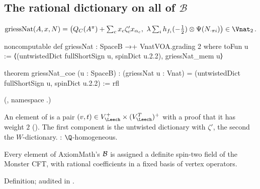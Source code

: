 \subsection{The rational dictionary on all of \texorpdfstring{$\mathcal B$}{B}}

\begin{definition}\label{ch21:def:griessNat}
$\mathrm{griessNat}(A,x,N)=\bigl(Q_C(A^\pi)+\sum_cx_c\zeta'_cx_{\alpha_c},\ \lambda\sum_ih_{f_i}(-\tfrac12)\otimes\Psi(N_{\cdot\pi i})\bigr)\in\Vnat_2$.
\end{definition}
\begin{leancode}
noncomputable def griessNat : SpaceB →+ VnatVOA.grading 2 where
  toFun u := ⟨(untwistedDict fullShortSign u, spinDict u.2.2), griessNat_mem u⟩
\end{leancode}
\begin{leancode}
theorem griessNat_coe (u : SpaceB) :
    (griessNat u : Vnat) = (untwistedDict fullShortSign u, spinDict u.2.2) := rfl
\end{leancode}
(, namespace .)
\begin{dictionary}
An element of  is a pair $(v,t)\in V_\Leech^+\times(V_\Leech^T)^+$ with a proof
that it has weight $2$ ().  The first component is the untwisted dictionary with
$\zeta'$, the second the $W$-dictionary.  : $\Q$-homogeneous.
\end{dictionary}
\begin{physics}
Every element of AxiomMath's $\mathcal{B}$ is assigned a definite spin-two field of the Monster CFT, with
rational coefficients in a fixed basis of vertex operators.
\end{physics}
\begin{status}
Definition; audited in .
\end{status}

